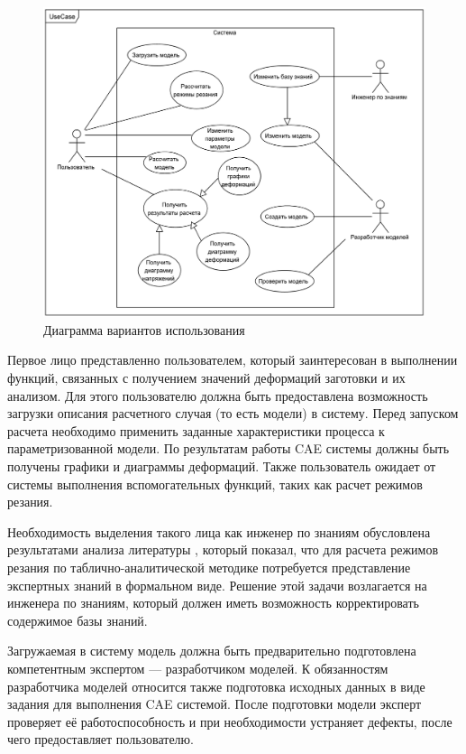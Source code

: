 \documentclass[14pt,oneside,final]{extreport}
\begin{document}
		\begin{figure}[!h]
		\begin{center}
		\includegraphics[scale=0.095]{img/ucd} 
		\end{center}
		\caption{Диаграмма вариантов использования}
		\label{fig:ucd}
		\end{figure}
		
	Первое лицо представленно пользователем, который заинтересован в выполнении функций, связанных с получением значений деформаций заготовки и их анализом. Для этого пользователю должна быть предоставлена возможность загрузки описания расчетного случая (то есть модели) в систему. Перед запуском расчета необходимо применить заданные характеристики процесса к параметризованной модели. По результатам работы CAE системы должны быть получены графики и диаграммы деформаций. Также пользователь ожидает от системы выполнения вспомогательных функций, таких как расчет режимов резания. 
	
	Необходимость выделения такого лица как инженер по знаниям обусловлена результатами анализа литературы \cite{book:Kosilova}, который показал, что для расчета режимов резания по таблично-аналитической методике потребуется представление экспертных знаний в формальном виде. Решение этой задачи возлагается на инженера по знаниям, который должен иметь возможность корректировать содержимое базы знаний.  

	Загружаемая в систему модель должна быть предварительно подготовлена компетентным экспертом --- разработчиком моделей. К обязанностям разработчика моделей относится также подготовка исходных данных в виде задания для выполнения CAE системой. После подготовки модели эксперт проверяет её работоспособность и при необходимости  устраняет дефекты, после чего предоставляет пользователю. 
	
\end{document}

